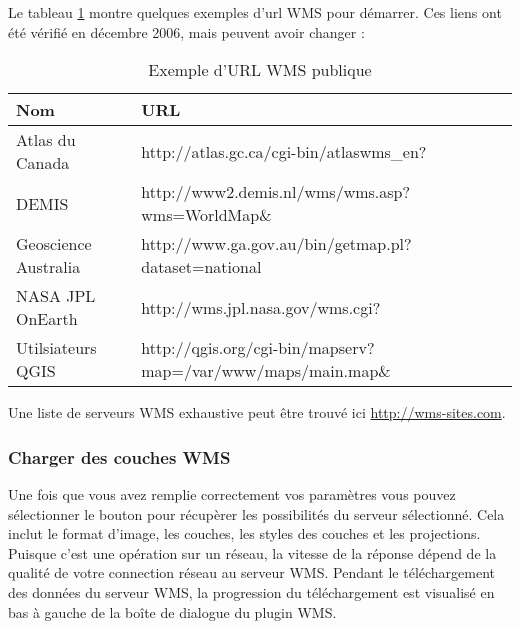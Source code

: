 Le tableau \ref{tab:wms_example_urls} montre quelques exemples d'url WMS
pour démarrer. Ces liens ont été vérifié en décembre 2006, mais peuvent
avoir changer :


\begin{table}[ht]
\centering
\caption{Exemple d'URL WMS publique}\label{tab:wms_example_urls}\medskip
 \begin{tabular}{|l|l|}
\hline \textbf{Nom}        & \textbf{URL} \\
\hline Atlas du Canada      & http://atlas.gc.ca/cgi-bin/atlaswms\_en? \\
\hline DEMIS                & http://www2.demis.nl/wms/wms.asp?wms=WorldMap\& \\
\hline Geoscience Australia &
http://www.ga.gov.au/bin/getmap.pl?dataset=national \\
\hline NASA JPL OnEarth     & http://wms.jpl.nasa.gov/wms.cgi? \\
\hline Utilsiateurs QGIS &
http://qgis.org/cgi-bin/mapserv?map=/var/www/maps/main.map\& \\
\hline
\end{tabular}
\end{table}

Une liste de serveurs WMS exhaustive peut être trouvé ici
\url{http://wms-sites.com}.

\subsubsection{Charger des
couches WMS}\label{sec:ogc-wms-layers}

Une fois que vous avez remplie correctement vos paramètres vous pouvez
sélectionner le bouton  pour récupèrer les possibilités du
serveur sélectionné. Cela inclut le format d'image, les couches, les styles des
couches et les projections. Puisque c'est une opération sur un réseau, la
vitesse de la réponse dépend de la qualité de votre connection réseau au
serveur WMS. Pendant le téléchargement des données du serveur WMS, la
progression du téléchargement est visualisé en bas à gauche de la boîte de
dialogue du plugin WMS.

